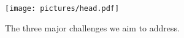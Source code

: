 
\begin{figure}[tb]
\vskip 0.2in
\begin{center}
\centerline{\texttt{[image: pictures/head.pdf]}}
\caption{The three major challenges we aim to address.}
\label{head}
\end{center}
\vskip -0.3in
\end{figure}
